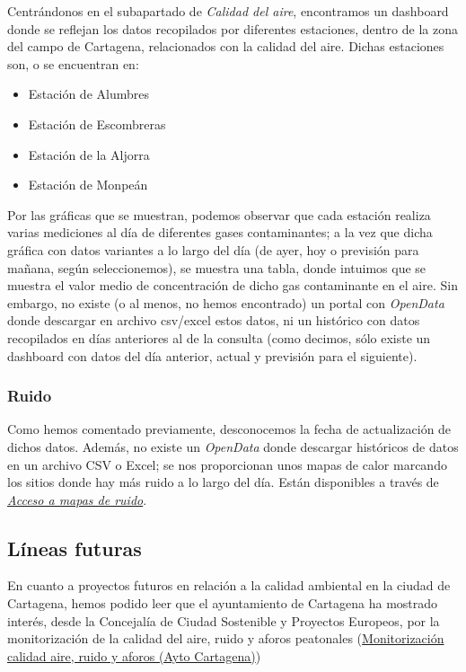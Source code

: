 \documentclass[12pt]{article}
\begin{document}
	Centrándonos en el subapartado de \textit{Calidad del aire}, encontramos un dashboard donde se reflejan los datos recopilados por diferentes estaciones, dentro de la zona del campo de Cartagena, relacionados con la calidad del aire. Dichas estaciones son, o se encuentran en: 
	
	\begin{itemize}
		\item Estación de Alumbres
		\item Estación de Escombreras
		\item Estación de la Aljorra
		\item Estación de Monpeán
	\end {itemize}
	
	Por las gráficas que se muestran, podemos observar que cada estación realiza varias mediciones al día de diferentes gases contaminantes; a la vez que dicha gráfica con datos variantes a lo largo del día (de ayer, hoy o previsión para mañana, según seleccionemos), se muestra una tabla, donde intuimos que se muestra el valor medio de concentración de dicho gas contaminante en el aire. Sin embargo, no existe (o al menos, no hemos encontrado) un portal con \textit{OpenData} donde descargar en archivo csv/excel estos datos, ni un histórico con datos recopilados en días anteriores al de la consulta (como decimos, sólo existe un dashboard con datos del día anterior, actual y previsión para el siguiente). \\
	
	\subsubsection{Ruido}
	
	Como hemos comentado previamente, desconocemos la fecha de actualización de dichos datos. Además, no existe un \textit{OpenData} donde descargar históricos de datos en un archivo CSV o Excel; se nos proporcionan unos mapas de calor marcando los sitios donde hay más ruido a lo largo del día. Están disponibles a través de \href{https://www.cartagena.es/plantillas/14b.asp?pt_idpag=1431}{\textit{Acceso a mapas de ruido}}.

	\subsection{Líneas futuras}
		
		En cuanto a proyectos futuros en relación a la calidad ambiental en la ciudad de Cartagena, hemos podido leer que el ayuntamiento de Cartagena ha mostrado interés, desde la Concejalía de Ciudad Sostenible y Proyectos Europeos, por la monitorización de la calidad del aire, ruido y aforos peatonales (\href{https://murciaplaza.com/cartagena-estudia-la-calidad-del-aire-ruidos-y-aforos-para-reducir-el-impacto-climatico-y-la-movilidad-urbana}{Monitorización calidad aire, ruido y aforos (Ayto Cartagena)})
\end{document}
